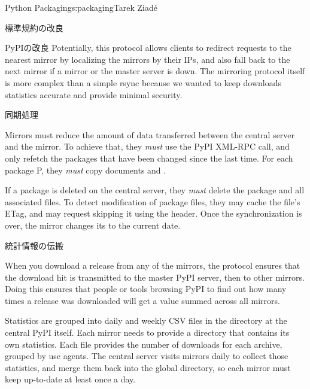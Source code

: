 \begin{aosachapter}{Python Packaging}{s:packaging}{Tarek Ziad\'{e}}
\begin{aosasect1}{標準規約の改良}
\begin{aosasect2}{PyPIの改良}
\noindent Potentially, this protocol allows clients to redirect requests to the
nearest mirror by localizing the mirrors by their IPs, and also fall
back to the next mirror if a mirror or the master server is down.  The
mirroring protocol itself is more complex than a simple rsync because
we wanted to keep downloads statistics accurate and provide minimal
security.

\begin{aosasect3}{同期処理}

Mirrors must reduce the amount of data transferred between the central
server and the mirror. To achieve that, they \emph{must} use the
 PyPI XML-RPC call, and only refetch the packages that
have been changed since the last time.  For each package P, they
\emph{must} copy documents  and .

If a package is deleted on the central server, they \emph{must} delete
the package and all associated files. To detect modification of
package files, they may cache the file's ETag, and may request
skipping it using the  header.  Once the
synchronization is over, the mirror changes its 
to the current date.

\end{aosasect3}

\begin{aosasect3}{統計情報の伝搬}

When you download a release from any of the mirrors, the protocol
ensures that the download hit is transmitted to the master PyPI
server, then to other mirrors.  Doing this ensures that people or
tools browsing PyPI to find out how many times a release was downloaded
will get a value summed across all mirrors.

Statistics are grouped into daily and weekly CSV files in the
 directory at the central PyPI itself.  Each mirror needs
to provide a  directory that contains its own
statistics. Each file provides the number of downloads for each
archive, grouped by use agents.  The central server visits mirrors
daily to collect those statistics, and merge them back into the global
 directory, so each mirror must keep 
up-to-date at least once a day.

\end{aosasect3}


\end{aosasect2}
\end{aosasect1}
\end{aosachapter}

